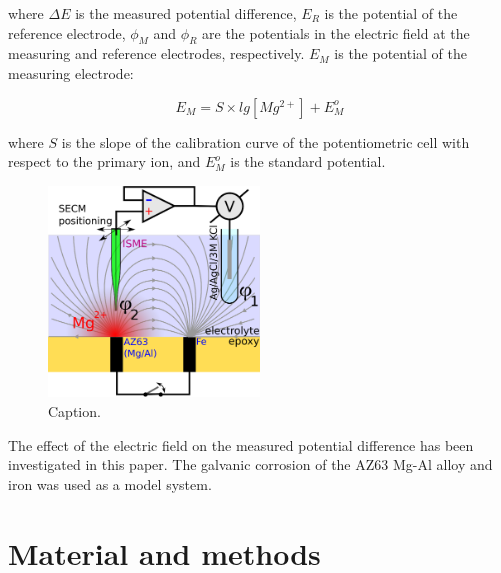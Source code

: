 \documentclass[3p]{elsarticle}
\begin{document}
where $\Delta E$ is the measured potential difference, $E_R$ is the potential of the reference electrode, $\phi_M$ and $\phi_R$ are the potentials in the electric field at the measuring and reference electrodes, respectively. $E_M$ is the potential of the measuring electrode:

\begin{equation}
E_M = S \times lg[Mg^{2+}] + E_M^o
\label{eq:measuring}
\end{equation}

where $S$ is the slope of the calibration curve of the potentiometric cell with respect to the primary ion, and $E_M^o$ is the standard potential.

\begin{figure}
\centering
\includegraphics[width=0.5\textwidth]{abstract.eps}
\caption{Caption.}
\label{fig:abstract}
\end{figure}

The effect of the electric field on the measured potential difference has been investigated in this paper. The galvanic corrosion of the AZ63 Mg-Al alloy and iron was used as a model system.


\section{Material and methods}
\end{document}
